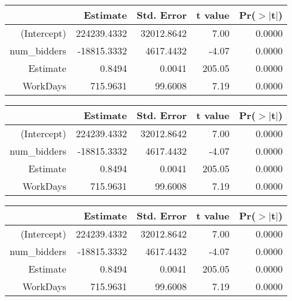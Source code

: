 \begin{table}[ht]
\begin{tabular}{rrrrr}
  \toprule
 & Estimate & Std. Error & t value & Pr($>$$|$t$|$) \\ 
  \midrule
(Intercept) & 224239.4332 & 32012.8642 & 7.00 & 0.0000 \\ 
  num\_bidders & -18815.3332 & 4617.4432 & -4.07 & 0.0000 \\ 
  Estimate & 0.8494 & 0.0041 & 205.05 & 0.0000 \\ 
  WorkDays & 715.9631 & 99.6008 & 7.19 & 0.0000 \\ 
   \bottomrule
\end{tabular}
\end{table}
\begin{table}[ht]
\begin{tabular}{rrrrr}
  \toprule
 & Estimate & Std. Error & t value & Pr($>$$|$t$|$) \\ 
  \midrule
(Intercept) & 224239.4332 & 32012.8642 & 7.00 & 0.0000 \\ 
  num\_bidders & -18815.3332 & 4617.4432 & -4.07 & 0.0000 \\ 
  Estimate & 0.8494 & 0.0041 & 205.05 & 0.0000 \\ 
  WorkDays & 715.9631 & 99.6008 & 7.19 & 0.0000 \\ 
   \bottomrule
\end{tabular}
\end{table}
\begin{table}[ht]
\begin{tabular}{rrrrr}
  \toprule
 & Estimate & Std. Error & t value & Pr($>$$|$t$|$) \\ 
  \midrule
(Intercept) & 224239.4332 & 32012.8642 & 7.00 & 0.0000 \\ 
  num\_bidders & -18815.3332 & 4617.4432 & -4.07 & 0.0000 \\ 
  Estimate & 0.8494 & 0.0041 & 205.05 & 0.0000 \\ 
  WorkDays & 715.9631 & 99.6008 & 7.19 & 0.0000 \\ 
   \bottomrule
\end{tabular}
\end{table}
